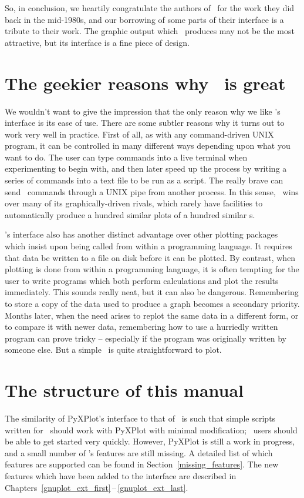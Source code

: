 So, in conclusion, we heartily congratulate the authors of \gnuplot\ for the
work they did back in the mid-1980s, and our borrowing of some parts of their
interface is a tribute to their work. The graphic output which \gnuplot\
produces may not be the most attractive, but its interface is a fine piece of
design.

\section{The geekier reasons why \gnuplot\ is great}

We wouldn't want to give the impression that the only reason why we like
\gnuplot's interface is its ease of use. There are some subtler reasons why it
turns out to work very well in practice. First of all, as with any
command-driven UNIX program, it can be controlled in many different ways
depending upon what you want to do. The user can type commands into a live
terminal when experimenting to begin with, and then later speed up the process
by writing a series of commands into a text file to be run as a script. The
really brave can send \gnuplot\ commands through a UNIX pipe from another
process. In this sense, \gnuplot\ wins over many of its graphically-driven
rivals, which rarely have facilities to automatically produce a hundred similar
plots of a hundred similar \datafile s.

\gnuplot's interface also has another distinct advantage over other plotting
packages which insist upon being called from within a programming language. It
requires that data be written to a file on disk before it can be plotted. By
contrast, when plotting is done from within a programming language, it is often
tempting for the user to write programs which both perform calculations and
plot the results immediately. This sounds really neat, but it can also be
dangerous. Remembering to store a copy of the data used to produce a graph
becomes a secondary priority. Months later, when the need arises to replot the
same data in a different form, or to compare it with newer data, remembering
how to use a hurriedly written program can prove tricky -- especially if the
program was originally written by someone else. But a simple \datafile\ is
quite straightforward to plot.

\section{The structure of this manual}

The similarity of PyXPlot's interface to that of \gnuplot\ is such that simple
scripts written for \gnuplot\ should work with PyXPlot with minimal
modification; \gnuplot\ users should be able to get started very quickly.
However, PyXPlot is still a work in progress, and a small number of \gnuplot's
features are still missing.  A detailed list of which features are supported
can be found in Section~\ref{missing_features}. The new features which have
been added to the interface are described in
Chapters~\ref{gnuplot_ext_first}\,--\,\ref{gnuplot_ext_last}.

